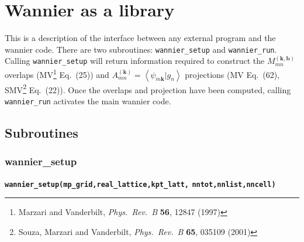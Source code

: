 \chapter{Wannier as a library}

This is a description of the interface between any external program and
the wannier code. There are two subroutines: \verb#wannier_setup# and
\verb#wannier_run#. Calling \verb#wannier_setup# will return
information required to 
construct the $M_{mn}^{(\mathbf{k,b})}$ overlaps (MV\footnote{Marzari
  and Vanderbilt, \textit{Phys.~Rev.~B} \textbf{56}, 12847 (1997)}
Eq.~(25)) and $A_{mn}^{(\mathbf{k})}=\left\langle
\psi_{m\mathbf{k}}|g_{n}\right\rangle$ projections (MV
Eq.~(62), SMV\footnote{Souza, Marzari and Vanderbilt,
  \textit{Phys.~Rev.~B} \textbf{65}, 035109 (2001)} Eq.~(22)). Once 
the overlaps and projection have been computed, calling
\verb#wannier_run# activates the main wannier code.


\section{Subroutines}

\subsection{wannier\_setup}

{\noindent \bf \verb#wannier_setup(mp_grid,real_lattice,kpt_latt,#
\verb#nntot,nnlist,nncell)#}


